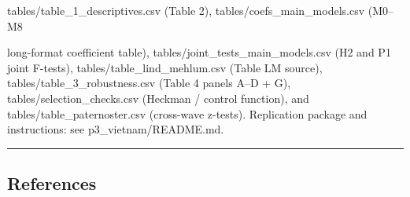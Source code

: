 \documentclass[12pt,a4paper]{article}
\begin{document}
tables/table\_1\_descriptives.csv (Table 2),
tables/coefs\_main\_models.csv (M0--M8

long-format coefficient table), tables/joint\_tests\_main\_models.csv
(H2 and P1 joint F-tests), tables/table\_lind\_mehlum.csv (Table LM
source), tables/table\_3\_robustness.csv (Table 4 panels A--D + G),
tables/selection\_checks.csv (Heckman / control function), and
tables/table\_paternoster.csv (cross-wave z-tests). Replication package
and instructions: see p3\_vietnam/README.md.

\begin{center}\rule{0.5\linewidth}{0.5pt}\end{center}

\hypertarget{references}{%
\subsection{References}\label{references}}
\end{document}
